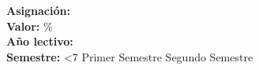 \documentclass[11pt]{article}
\begin{document}
    \noindent
    \fontsize{12}{14}\selectfont
    \color{darkblue}
    \textbf{\institucion} \\
    \textbf{\nombrecurso} \\
    \fontsize{10}{12}\selectfont
    \color{black}
    \newline
    \textbf{Asignación: } \nombreproyecto \\
    \textbf{Valor: } \valorporcentual\% \\
    \textbf{Año lectivo: } {
        \the\year
    } \\
    \textbf{Semestre:} {
        \ifnum\month<7 Primer Semestre \else Segundo Semestre \fi
    } \\

    \newcommand{\colornota}{
        \ifnum\nota<70 red \else green \fi
    }

    
\end{document}

